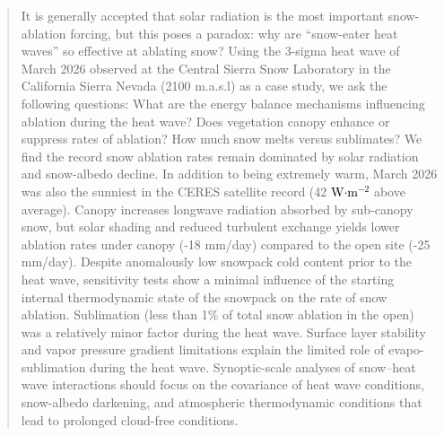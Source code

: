 \documentclass[draft]{agujournal2019}
\newcommand{\wmsq}{\textcolor{black}{W$\cdot$m$^{-2}$}\xspace}
\begin{document}
\begin{abstract}
It is generally accepted that solar radiation is the most important snow-ablation forcing, but this poses a paradox: why are ``snow-eater heat waves'' so effective at ablating snow? 
Using the 3-sigma heat wave of March 2026 observed at the Central Sierra Snow Laboratory in the California Sierra Nevada (2100 m.a.s.l) as a case study, we ask the following questions: What are the energy balance mechanisms influencing ablation during the heat wave? Does vegetation canopy enhance or suppress rates of ablation? How much snow melts versus sublimates? 
We find the record snow ablation rates remain dominated by solar radiation and snow-albedo decline. 
In addition to being extremely warm, March 2026 was also the sunniest in the CERES satellite record (42 \wmsq above average). 
Canopy increases longwave radiation absorbed by sub-canopy snow, but solar shading and reduced turbulent exchange yields lower ablation rates under canopy (-18 mm/day) compared to the open site (-25 mm/day). 
Despite anomalously low snowpack cold content prior to the heat wave, sensitivity tests show a minimal influence of the starting internal thermodynamic state of the snowpack on the rate of snow ablation. 
Sublimation (less than 1\% of total snow ablation in the open) was a relatively minor factor during the heat wave. 
Surface layer stability and vapor pressure gradient limitations explain the limited role of evapo-sublimation during the heat wave.
Synoptic-scale analyses of snow--heat wave interactions should focus on the covariance of heat wave conditions, snow-albedo darkening, and atmospheric thermodynamic conditions that lead to prolonged cloud-free conditions.

\end{abstract}
\end{document}
